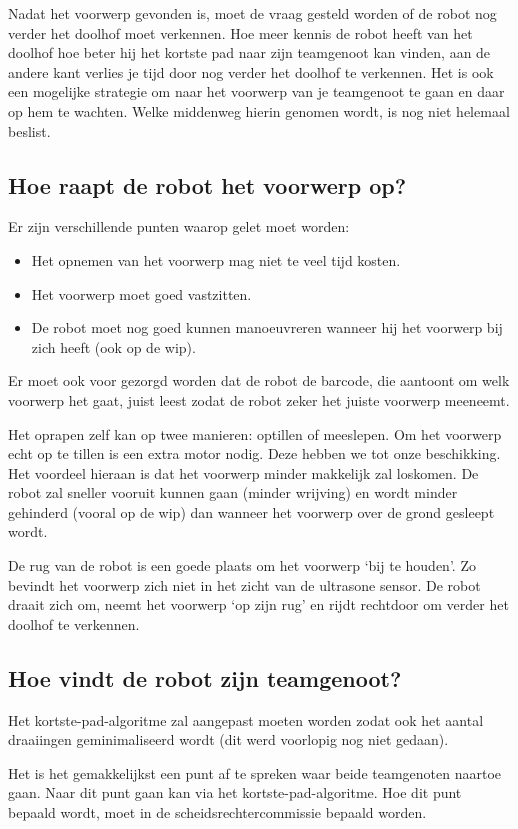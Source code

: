 \documentclass{peno}
\begin{document}
Nadat het voorwerp gevonden is, moet de vraag gesteld worden of de robot nog verder het doolhof moet verkennen. Hoe meer kennis de robot heeft van het doolhof hoe beter hij het kortste pad naar zijn teamgenoot kan vinden, aan de andere kant verlies je tijd door nog verder het doolhof te verkennen. Het is ook een mogelijke strategie om naar het voorwerp van je teamgenoot te gaan en daar op hem te wachten. Welke middenweg hierin genomen wordt, is nog niet helemaal beslist.

\subsection*{Hoe raapt de robot het voorwerp op?}
Er zijn verschillende punten waarop gelet moet worden:
\begin{itemize}
\item Het opnemen van het voorwerp mag niet te veel tijd kosten.
\item Het voorwerp moet goed vastzitten.
\item De robot moet nog goed kunnen manoeuvreren wanneer hij het voorwerp bij zich heeft (ook op de wip).
\end{itemize} 

Er moet ook voor gezorgd worden dat de robot de barcode, die aantoont om welk voorwerp het gaat, juist leest zodat de robot zeker het juiste voorwerp meeneemt.

Het oprapen zelf kan op twee manieren: optillen of meeslepen. Om het voorwerp echt op te tillen is een extra motor nodig. Deze hebben we tot onze beschikking. Het voordeel hieraan is dat het voorwerp minder makkelijk zal loskomen. De robot zal sneller vooruit kunnen gaan (minder wrijving) en wordt minder gehinderd (vooral op de wip) dan wanneer het voorwerp over de grond gesleept wordt.

De rug van de robot is een goede plaats om het voorwerp `bij te houden'. Zo bevindt het voorwerp zich niet in het zicht van de ultrasone sensor. De robot draait zich om, neemt het voorwerp `op zijn rug' en rijdt rechtdoor om verder het doolhof te verkennen.

\subsection*{Hoe vindt de robot zijn teamgenoot?}
Het kortste-pad-algoritme zal aangepast moeten worden zodat ook het aantal draaiingen geminimaliseerd wordt (dit werd voorlopig nog niet gedaan).

Het is het gemakkelijkst een punt af te spreken waar beide teamgenoten naartoe gaan. Naar dit punt gaan kan via het kortste-pad-algoritme. Hoe dit punt bepaald wordt, moet in de scheidsrechtercommissie bepaald worden.
\end{document}
